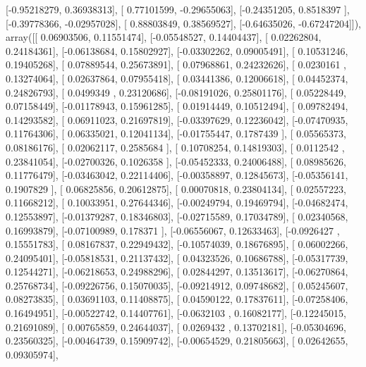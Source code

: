 \documentclass{article}
\begin{document}
       [-0.95218279,  0.36938313],
       [ 0.77101599, -0.29655063],
       [-0.24351205,  0.8518397 ],
       [-0.39778366, -0.02957028],
       [ 0.88803849,  0.38569527],
       [-0.64635026, -0.67247204]]), array([[ 0.06903506,  0.11551474],
       [-0.05548527,  0.14404437],
       [ 0.02262804,  0.24184361],
       [-0.06138684,  0.15802927],
       [-0.03302262,  0.09005491],
       [ 0.10531246,  0.19405268],
       [ 0.07889544,  0.25673891],
       [ 0.07968861,  0.24232626],
       [ 0.0230161 ,  0.13274064],
       [ 0.02637864,  0.07955418],
       [ 0.03441386,  0.12006618],
       [ 0.04452374,  0.24826793],
       [ 0.0499349 ,  0.23120686],
       [-0.08191026,  0.25801176],
       [ 0.05228449,  0.07158449],
       [-0.01178943,  0.15961285],
       [ 0.01914449,  0.10512494],
       [ 0.09782494,  0.14293582],
       [ 0.06911023,  0.21697819],
       [-0.03397629,  0.12236042],
       [-0.07470935,  0.11764306],
       [ 0.06335021,  0.12041134],
       [-0.01755447,  0.1787439 ],
       [ 0.05565373,  0.08186176],
       [ 0.02062117,  0.2585684 ],
       [ 0.10708254,  0.14819303],
       [ 0.0112542 ,  0.23841054],
       [-0.02700326,  0.1026358 ],
       [-0.05452333,  0.24006488],
       [ 0.08985626,  0.11776479],
       [-0.03463042,  0.22114406],
       [-0.00358897,  0.12845673],
       [-0.05356141,  0.1907829 ],
       [ 0.06825856,  0.20612875],
       [ 0.00070818,  0.23804134],
       [ 0.02557223,  0.11668212],
       [ 0.10033951,  0.27644346],
       [-0.00249794,  0.19469794],
       [-0.04682474,  0.12553897],
       [-0.01379287,  0.18346803],
       [-0.02715589,  0.17034789],
       [ 0.02340568,  0.16993879],
       [-0.07100989,  0.178371  ],
       [-0.06556067,  0.12633463],
       [-0.0926427 ,  0.15551783],
       [ 0.08167837,  0.22949432],
       [-0.10574039,  0.18676895],
       [ 0.06002266,  0.24095401],
       [-0.05818531,  0.21137432],
       [ 0.04323526,  0.10686788],
       [-0.05317739,  0.12544271],
       [-0.06218653,  0.24988296],
       [ 0.02844297,  0.13513617],
       [-0.06270864,  0.25768734],
       [-0.09226756,  0.15070035],
       [-0.09214912,  0.09748682],
       [ 0.05245607,  0.08273835],
       [ 0.03691103,  0.11408875],
       [ 0.04590122,  0.17837611],
       [-0.07258406,  0.16494951],
       [-0.00522742,  0.14407761],
       [-0.0632103 ,  0.16082177],
       [-0.12245015,  0.21691089],
       [ 0.00765859,  0.24644037],
       [ 0.0269432 ,  0.13702181],
       [-0.05304696,  0.23560325],
       [-0.00464739,  0.15909742],
       [-0.00654529,  0.21805663],
       [ 0.02642655,  0.09305974],
\end{document}
